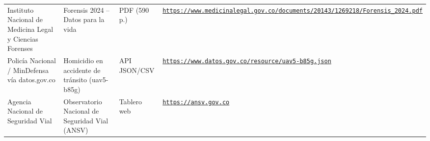 \documentclass[11pt,letterpaper]{article}
\begin{document}
{\begin{xltabular}{\linewidth}{L{2.8cm}YL{1.6cm}Y}
Instituto Nacional de Medicina Legal y Ciencias Forenses & Forensis 2024 -- Datos para la vida & PDF (590 p.\allowbreak{}) & \texttt{\footnotesize \href{https://www.medicinalegal.gov.co/documents/20143/1269218/Forensis_2024.pdf}{https:/\allowbreak{}}\allowbreak{}\href{https://www.medicinalegal.gov.co/documents/20143/1269218/Forensis_2024.pdf}{/\allowbreak{}}\allowbreak{}\href{https://www.medicinalegal.gov.co/documents/20143/1269218/Forensis_2024.pdf}{www.\allowbreak{}medicinalegal.\allowbreak{}gov.\allowbreak{}co/\allowbreak{}}\allowbreak{}\href{https://www.medicinalegal.gov.co/documents/20143/1269218/Forensis_2024.pdf}{documents/\allowbreak{}}\allowbreak{}\href{https://www.medicinalegal.gov.co/documents/20143/1269218/Forensis_2024.pdf}{20143/\allowbreak{}}\allowbreak{}\href{https://www.medicinalegal.gov.co/documents/20143/1269218/Forensis_2024.pdf}{1269218/\allowbreak{}}\allowbreak{}\href{https://www.medicinalegal.gov.co/documents/20143/1269218/Forensis_2024.pdf}{Forensis\_\allowbreak{}2024.\allowbreak{}pdf}} \\
Policía Nacional /\allowbreak{} MinDefensa vía datos.\allowbreak{}gov.\allowbreak{}co & Homicidio en accidente de tránsito (uav5-b85g) & API JSON/\allowbreak{}CSV & \texttt{\footnotesize \href{https://www.datos.gov.co/resource/uav5-b85g.json}{https:/\allowbreak{}}\allowbreak{}\href{https://www.datos.gov.co/resource/uav5-b85g.json}{/\allowbreak{}}\allowbreak{}\href{https://www.datos.gov.co/resource/uav5-b85g.json}{www.\allowbreak{}datos.\allowbreak{}gov.\allowbreak{}co/\allowbreak{}}\allowbreak{}\href{https://www.datos.gov.co/resource/uav5-b85g.json}{resource/\allowbreak{}}\allowbreak{}\href{https://www.datos.gov.co/resource/uav5-b85g.json}{uav5-\allowbreak{}b85g.\allowbreak{}json}} \\
Agencia Nacional de Seguridad Vial & Observatorio Nacional de Seguridad Vial (ANSV) & Tablero web & \texttt{\footnotesize \href{https://ansv.gov.co}{https:/\allowbreak{}}\allowbreak{}\href{https://ansv.gov.co}{/\allowbreak{}}\allowbreak{}\href{https://ansv.gov.co}{ansv.\allowbreak{}gov.\allowbreak{}co}} \\

\end{xltabular}}
\end{document}

